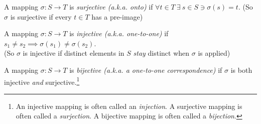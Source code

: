 \begin{definition}
\label{def:surj_inj_bij}
A mapping $\sigma: S\rightarrow T$ is \textit{surjective (a.k.a. onto)} if
$\forall t\in T \ \exists \ s\in S \ni \sigma(s)=t$. (So $\sigma$ is surjective if every $t\in T$
has a pre-image)\steezybreak

\noindent A mapping $\sigma: S\rightarrow T$ is \textit{injective (a.k.a. one-to-one)} if
$s_1\neq s_2 \implies \sigma(s_1)\neq \sigma(s_2)$. \\(So $\sigma$ is injective if distinct elements
in $S$ \textit{stay} distinct when $\sigma$ is applied)\steezybreak

\noindent A mapping $\sigma: S\rightarrow T$ is \textit{bijective (a.k.a. a one-to-one
correspondence)} if $\sigma$ is both injective \textit{and} surjective.\footnote{An injective
mapping is often called an \textit{injection}. A surjective mapping is often called
a \textit{surjection}. A bijective mapping is often called a
\textit{bijection}.}
\end{definition}



